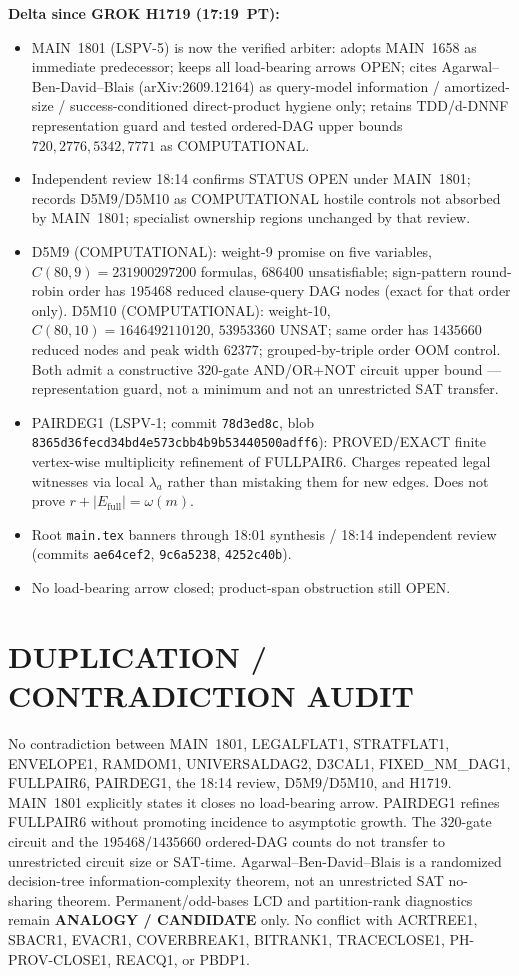\documentclass[11pt]{article}
\begin{document}
\textbf{Delta since GROK H1719 (17:19~PT):}
\begin{itemize}
\item MAIN~1801 (LSPV-5) is now the verified arbiter: adopts MAIN~1658 as
immediate predecessor; keeps all load-bearing arrows OPEN; cites
Agarwal--Ben-David--Blais (arXiv:2609.12164) as query-model information /
amortized-size / success-conditioned direct-product hygiene only; retains
TDD/d-DNNF representation guard and tested ordered-DAG upper bounds
$720,2776,5342,7771$ as COMPUTATIONAL.
\item Independent review 18:14 confirms STATUS OPEN under MAIN~1801; records
D5M9/D5M10 as COMPUTATIONAL hostile controls not absorbed by MAIN~1801;
specialist ownership regions unchanged by that review.
\item D5M9 (COMPUTATIONAL): weight-9 promise on five variables,
$C(80,9)=231900297200$ formulas, $686400$ unsatisfiable; sign-pattern
round-robin order has $195468$ reduced clause-query DAG nodes (exact for
that order only). D5M10 (COMPUTATIONAL): weight-10,
$C(80,10)=1646492110120$, $53953360$ UNSAT; same order has $1435660$ reduced
nodes and peak width $62377$; grouped-by-triple order OOM control. Both admit
a constructive $320$-gate AND/OR+NOT circuit upper bound --- representation
guard, not a minimum and not an unrestricted SAT transfer.
\item PAIRDEG1 (LSPV-1; commit \texttt{78d3ed8c}, blob
\texttt{8365d36fecd34bd4e573cbb4b9b53440500adff6}): PROVED/EXACT finite
vertex-wise multiplicity refinement of FULLPAIR6. Charges repeated legal
witnesses via local $\lambda_a$ rather than mistaking them for new edges.
Does not prove $r+|E_{\mathrm{full}}|=\omega(m)$.
\item Root \texttt{main.tex} banners through 18:01 synthesis / 18:14 independent
review (commits \texttt{ae64cef2}, \texttt{9c6a5238}, \texttt{4252c40b}).
\item No load-bearing arrow closed; product-span obstruction still OPEN.
\end{itemize}

\section*{DUPLICATION / CONTRADICTION AUDIT}
No contradiction between MAIN~1801, LEGALFLAT1, STRATFLAT1, ENVELOPE1, RAMDOM1,
UNIVERSALDAG2, D3CAL1, FIXED\_NM\_DAG1, FULLPAIR6, PAIRDEG1, the 18:14 review,
D5M9/D5M10, and H1719. MAIN~1801 explicitly states it closes no load-bearing
arrow. PAIRDEG1 refines FULLPAIR6 without promoting incidence to asymptotic
growth. The $320$-gate circuit and the $195468$/$1435660$ ordered-DAG counts do
not transfer to unrestricted circuit size or SAT-time. Agarwal--Ben-David--Blais
is a randomized decision-tree information-complexity theorem, not an unrestricted
SAT no-sharing theorem. Permanent/odd-bases LCD and partition-rank diagnostics
remain \textbf{ANALOGY / CANDIDATE} only. No conflict with ACRTREE1, SBACR1,
EVACR1, COVERBREAK1, BITRANK1, TRACECLOSE1, PH-PROV-CLOSE1, REACQ1, or PBDP1.
\end{document}
